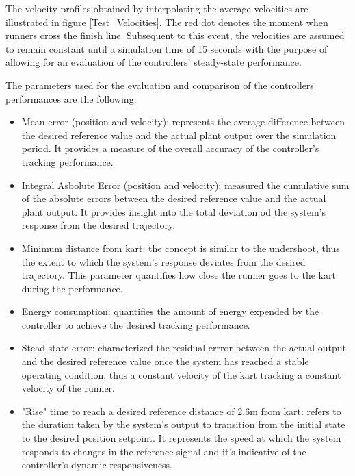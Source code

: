 \documentclass[a4paper,12pt,oneside]{book}
\begin{document}
The velocity profiles obtained by interpolating the average velocities are illustrated in figure \ref{Test_Velocities}.
The red dot denotes the moment when runners cross the finish line.
Subsequent to this event, the velocities are assumed to remain constant until a simulation time of 15 seconds with the purpose of allowing for an evaluation of the controllers' steady-state performance.

The parameters used for the evaluation and comparison of the controllers performances are the following:
\begin{itemize}
	\item Mean error (position and velocity): represents the average difference between the desired reference value and the actual plant output over the simulation period. It provides a measure of the overall accuracy of the controller's tracking performance.
	\item Integral Asbolute Error (position and velocity): measured the cumulative sum of the absolute errors between the desired reference value and the actual plant output. It provides insight into the total deviation od the system's response from the desired trajectory.
	\item Minimum distance from kart: the concept is similar to the undershoot, thus the extent to which the system's response deviates from the desired trajectory. This parameter quantifies how close the runner goes to the kart during the performance.
	\item Energy consumption: quantifies the amount of energy expended by the controller to achieve the desired tracking performance.
	\item Stead-state error: characterized the residual errror between the actual output and the desired reference value once the system has reached a stable operating condition, thus a constant velocity of the kart tracking a constant velocity of the runner.
	\item "Rise" time to reach a desired reference distance of 2.6m from kart: refers to the duration taken by the system's output to transition from the initial state to the desired position setpoint. It represents the speed at which the system responds to changes in the reference signal and it's indicative of the controller's dynamic responsiveness.
\end{itemize}

\newpage
\end{document}
